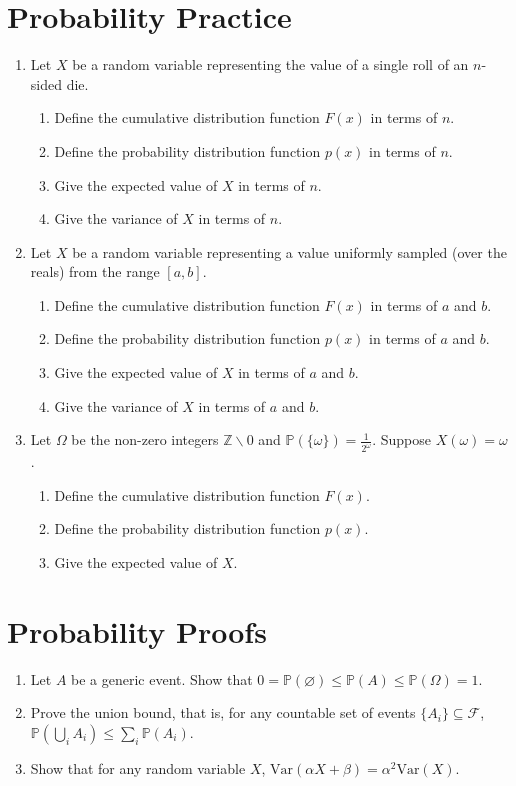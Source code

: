 \documentclass{article}
\newcommand{\PrMe}{\mathbb{P}}
\begin{document}
\section{Probability Practice}
\begin{enumerate}[label=\arabic*.]
\item Let $X$ be a random variable representing the value of a single roll of an $n$-sided die.
	\begin{enumerate}[label=(\alph*)]
	\item Define the cumulative distribution function $F(x)$ in terms of $n$.
	\item Define the probability distribution function $p(x)$ in terms of $n$.
	\item Give the expected value of $X$ in terms of $n$.
	\item Give the variance of $X$ in terms of $n$.
	\end{enumerate}
\item Let $X$ be a random variable representing a value uniformly sampled (over the reals) from the range $[a, b]$.
	\begin{enumerate}[label=(\alph*)]
	\item Define the cumulative distribution function $F(x)$ in terms of $a$ and $b$.
	\item Define the probability distribution function $p(x)$ in terms of $a$ and $b$.
	\item Give the expected value of $X$ in terms of $a$ and $b$.
	\item Give the variance of $X$ in terms of $a$ and $b$.
	\end{enumerate}
\item Let $\Omega$ be the non-zero integers $\mathbb{Z} \backslash 0$ and $\PrMe(\{\omega\}) = \frac{1}{2^\omega}$. Suppose $X(\omega) = \omega$.
	\begin{enumerate}[label=(\alph*)]
	\item Define the cumulative distribution function $F(x)$.
	\item Define the probability distribution function $p(x)$.
	\item Give the expected value of $X$.
	\end{enumerate}
\end{enumerate}

\section{Probability Proofs}
\begin{enumerate}[label=\arabic*.]
\item Let $A$ be a generic event. Show that $0 = \PrMe(\varnothing) \leq \PrMe(A) \leq \PrMe(\Omega) = 1$.
\item Prove the union bound, that is, for any countable set of events $\{A_i\} \subseteq \mathcal{F}$, $\PrMe(\bigcup_iA_i) \leq \sum_i\PrMe(A_i)$.
\item Show that for any random variable $X$, $\text{Var}(\alpha X + \beta) = \alpha^2\text{Var}(X)$.
\end{enumerate}
\end{document}
